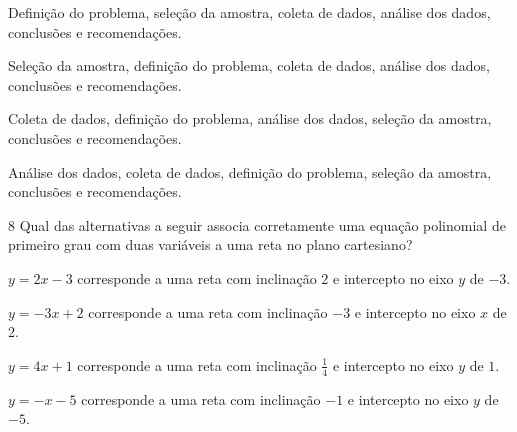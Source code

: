 \begin{escolha}
\item Definição do problema, seleção da amostra, coleta de dados, análise
dos dados, conclusões e recomendações.
\item Seleção da amostra, definição do problema, coleta de dados, análise
dos dados, conclusões e recomendações.
\item Coleta de dados, definição do problema, análise dos dados, seleção da
amostra, conclusões e recomendações.
\item Análise dos dados, coleta de dados, definição do problema, seleção da
amostra, conclusões e recomendações.
\end{escolha}



\num{8}  Qual das alternativas a seguir associa corretamente uma equação
polinomial de primeiro grau com duas variáveis a uma reta no plano cartesiano?

\begin{escolha}
\item $y = 2x - 3$ corresponde a uma reta com inclinação $2$ e intercepto no eixo $y$ de $-3$.
\item $y = -3x + 2$ corresponde a uma reta com inclinação $-3$ e intercepto no eixo $x$ de $2$.
\item $y = 4x + 1$ corresponde a uma reta com inclinação $\frac{1}{4}$ e intercepto no eixo $y$ de $1$.
\item $y = -x - 5$ corresponde a uma reta com inclinação $-1$ e intercepto no eixo $y$ de $-5$.
\end{escolha}


